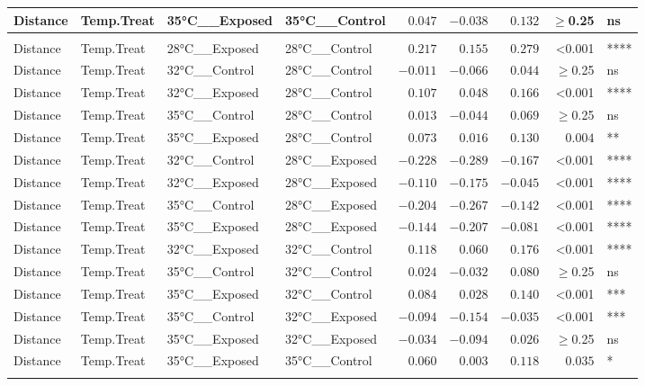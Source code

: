 \documentclass[
]{article}
\begin{document}
\begin{longtable}{llllrrrrl}
Distance & Temp.Treat & 35°C\_\_Exposed & 35°C\_\_Control & $0.047$ & $-0.038$ & $0.132$ & $\geq$0.25 & ns \\ 
\midrule\addlinespace[2.5pt]
\multicolumn{9}{l}{canberra} \\ 
\midrule\addlinespace[2.5pt]
Distance & Temp.Treat & 28°C\_\_Exposed & 28°C\_\_Control & $0.217$ & $0.155$ & $0.279$ & <0.001 & **** \\ 
Distance & Temp.Treat & 32°C\_\_Control & 28°C\_\_Control & $-0.011$ & $-0.066$ & $0.044$ & $\geq$0.25 & ns \\ 
Distance & Temp.Treat & 32°C\_\_Exposed & 28°C\_\_Control & $0.107$ & $0.048$ & $0.166$ & <0.001 & **** \\ 
Distance & Temp.Treat & 35°C\_\_Control & 28°C\_\_Control & $0.013$ & $-0.044$ & $0.069$ & $\geq$0.25 & ns \\ 
Distance & Temp.Treat & 35°C\_\_Exposed & 28°C\_\_Control & $0.073$ & $0.016$ & $0.130$ & $0.004$ & ** \\ 
Distance & Temp.Treat & 32°C\_\_Control & 28°C\_\_Exposed & $-0.228$ & $-0.289$ & $-0.167$ & <0.001 & **** \\ 
Distance & Temp.Treat & 32°C\_\_Exposed & 28°C\_\_Exposed & $-0.110$ & $-0.175$ & $-0.045$ & <0.001 & **** \\ 
Distance & Temp.Treat & 35°C\_\_Control & 28°C\_\_Exposed & $-0.204$ & $-0.267$ & $-0.142$ & <0.001 & **** \\ 
Distance & Temp.Treat & 35°C\_\_Exposed & 28°C\_\_Exposed & $-0.144$ & $-0.207$ & $-0.081$ & <0.001 & **** \\ 
Distance & Temp.Treat & 32°C\_\_Exposed & 32°C\_\_Control & $0.118$ & $0.060$ & $0.176$ & <0.001 & **** \\ 
Distance & Temp.Treat & 35°C\_\_Control & 32°C\_\_Control & $0.024$ & $-0.032$ & $0.080$ & $\geq$0.25 & ns \\ 
Distance & Temp.Treat & 35°C\_\_Exposed & 32°C\_\_Control & $0.084$ & $0.028$ & $0.140$ & <0.001 & *** \\ 
Distance & Temp.Treat & 35°C\_\_Control & 32°C\_\_Exposed & $-0.094$ & $-0.154$ & $-0.035$ & <0.001 & *** \\ 
Distance & Temp.Treat & 35°C\_\_Exposed & 32°C\_\_Exposed & $-0.034$ & $-0.094$ & $0.026$ & $\geq$0.25 & ns \\ 
Distance & Temp.Treat & 35°C\_\_Exposed & 35°C\_\_Control & $0.060$ & $0.003$ & $0.118$ & $0.035$ & * \\ 
\midrule\addlinespace[2.5pt]
\multicolumn{9}{l}{gunifrac} \\ 

\end{longtable}
\end{document}
